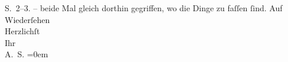\begin{ledgroupsized}[t]{13cm}
{{{                     S. 2–3.}}}\label{K_L03033-11h} – beide {\pb}Mal
               gleich dorthin gegriffen, wo die Dinge zu faſſen ſind. \pend
           \pstart
           Auf Wiederſehen {\\[\baselineskip]}Herzlichſt {\\[\baselineskip]}Ihr {\\[\baselineskip]}\spacefill\mbox{A. S.}\pend
           \leftskip=0em{}
         
         \endnumbering{}\end{ledgroupsized}\begin{anhang}\end{anhang}\newcommand{\dateiname}{L03033}\newcommand{\titel}{Arthur Schnitzler an Felix Salten, [10. 11. 1898?]}\newcommand{\editorInnen}{Martin Anton Müller und Laura Untner}
      